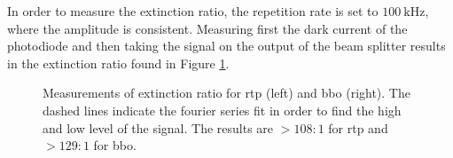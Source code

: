 In order to measure the extinction ratio, the repetition rate is set to $\SI{100}{\kilo \hertz}$, where the amplitude is consistent. Measuring first the dark current of the photodiode and then taking the signal on the output of the beam splitter results in the extinction ratio found in Figure \ref{fig:eom_extc}.

\begin{figure}[t]
\label{fig:eom_extc}
\caption{Measurements of extinction ratio for \ac{rtp} (left) and \ac{bbo} (right). The dashed lines indicate the fourier series fit in order to find the high and low level of the signal. The results are $>108:1$ for \ac{rtp} and $>129:1$ for \ac{bbo}.}
\end{figure}
